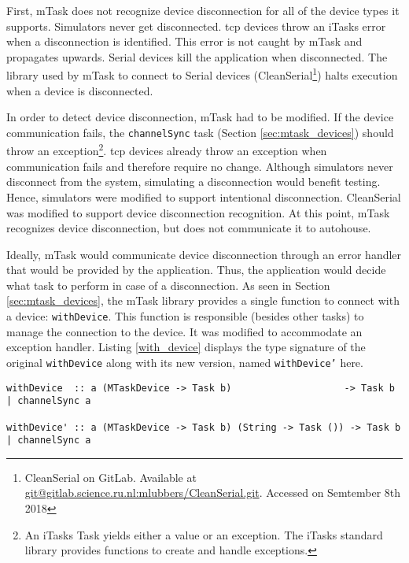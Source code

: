 First, \gls{mTask} does not recognize device disconnection for all of the device types it supports. Simulators never get disconnected. \acs{tcp} devices throw an \gls{iTasks} error when a disconnection is identified. This error is not caught by mTask and propagates upwards. Serial devices kill the application when disconnected. The library used by \gls{mTask} to connect to Serial devices (CleanSerial\footnote{CleanSerial on GitLab. Available at \url{git@gitlab.science.ru.nl:mlubbers/CleanSerial.git}. Accessed on Semtember 8th 2018}) halts execution when a device is disconnected. 

In order to detect device disconnection, \gls{mTask} had to be modified. If the device communication fails, the \texttt{channelSync} task (Section \ref{sec:mtask_devices}) should throw an exception\footnote{An \gls{iTasks} Task yields either a value or an exception. The \gls{iTasks} standard library provides functions to create and handle exceptions.}. \acs{tcp} devices already throw an exception when communication fails and therefore require no change. Although simulators never disconnect from the system, simulating a disconnection would benefit testing. Hence, simulators were modified to support intentional disconnection. CleanSerial was modified to support device disconnection recognition. At this point, \gls{mTask} recognizes device disconnection, but does not communicate it to \gls{autohouse}. 

Ideally, \gls{mTask} would communicate device disconnection through an error handler that would be provided by the application. Thus, the application would decide what task to perform in case of a disconnection. As seen in Section \ref{sec:mtask_devices}, the \gls{mTask} library provides a single function to connect with a device: \texttt{withDevice}. This function is responsible (besides other tasks) to manage the connection to the device. It was modified to accommodate an exception handler. Listing \ref{with_device} displays the type signature of the original \texttt{withDevice} along with its new version, named \texttt{withDevice'} here.

\begin{lstlisting}[caption=Change in mTask to allow device disconnection handler,captionpos=b,label=with_device]
withDevice  :: a (MTaskDevice -> Task b)                    -> Task b | channelSync a

withDevice' :: a (MTaskDevice -> Task b) (String -> Task ()) -> Task b | channelSync a
\end{lstlisting}

